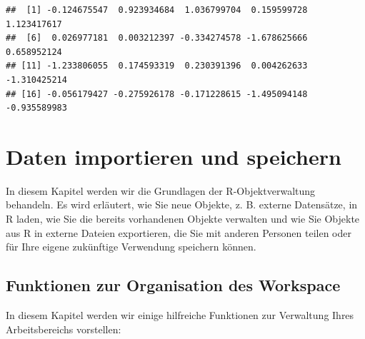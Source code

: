 \documentclass[
]{book}
\begin{document}
\begin{verbatim}
##  [1] -0.124675547  0.923934684  1.036799704  0.159599728  1.123417617
##  [6]  0.026977181  0.003212397 -0.334274578 -1.678625666  0.658952124
## [11] -1.233806055  0.174593319  0.230391396  0.004262633 -1.310425214
## [16] -0.056179427 -0.275926178 -0.171228615 -1.495094148 -0.935589983
\end{verbatim}

\hypertarget{daten-importieren-und-speichern}{%
\chapter{Daten importieren und speichern}\label{daten-importieren-und-speichern}}

In diesem Kapitel werden wir die Grundlagen der R-Objektverwaltung behandeln. Es wird erläutert, wie Sie neue Objekte, z. B. externe Datensätze, in R laden, wie Sie die bereits vorhandenen Objekte verwalten und wie Sie Objekte aus R in externe Dateien exportieren, die Sie mit anderen Personen teilen oder für Ihre eigene zukünftige Verwendung speichern können.

\hypertarget{funktionen-zur-organisation-des-workspace}{%
\section{Funktionen zur Organisation des Workspace}\label{funktionen-zur-organisation-des-workspace}}

In diesem Kapitel werden wir einige hilfreiche Funktionen zur Verwaltung Ihres Arbeitsbereichs vorstellen:
\end{document}
